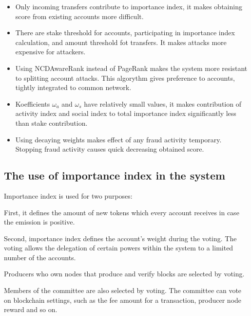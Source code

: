 \documentclass[a4paper,12pt]{article}
\begin{document}
\begin{itemize}
  \item Only incoming transfers contribute to importance index, it makes obtaining score from existing accounts more difficult.
  \item There are stake threshold for accounts, participating in importance index calculation, and amount threshold fot transfers. It makes attacks more expensive for attackers.
  \item Using NCDAwareRank instead of PageRank makes the system more resistant to splitting account attacks. This algorythm gives preference to accounts, tightly integrated to common network.
  \item Koefficients $\omega_a$ and $\omega_s$ have relatively small values, it makes contribution of activity index and social index to total importance index significantly less than stake contribution.
  \item Using decaying weights makes effect of any fraud activity temporary. Stopping fraud activity causes quick decreasing obtained score.
\end{itemize}


\subsection{The use of importance index in the system}

Importance index is used for two purposes:

First, it defines the amount of new tokens which every account receives in case the emission is positive. 

Second, importance index defines the account’s weight during the voting. The voting allows the delegation  of certain powers within the system to a limited number of the accounts. 

Producers who own nodes that produce and verify blocks are selected by voting.

Members of the committee are also selected by voting. The committee can vote on blockchain settings, such as the fee amount for a transaction, producer node reward and so on. 

% 
% 
% 
% 
\end{document}
